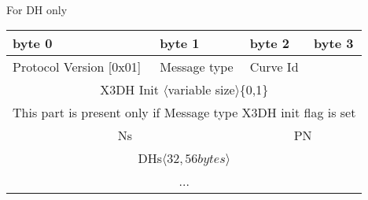 \documentclass[a4paper,11pt]{article}
\begin{document}
      \paragraph*{}For DH only
      \begin{center}
      \begin{tabular}{ | p{1.4in} | p{1.4in} | p{1.4in} | p{1.4in} |}
        \hline
        \cellcolor[gray]{0.85} byte 0 & \cellcolor[gray]{0.85} byte 1 & \cellcolor[gray]{0.85} byte 2 & \cellcolor[gray]{0.85}byte 3\\
        \hline
        Protocol Version [0x01] & Message type & Curve Id & \\
        \cline{1-3}
        \multicolumn{4}{|c|}{X3DH Init $\langle $variable size$\rangle $\{0,1\}}\\
        \multicolumn{4}{|c|}{This part is present only if Message type X3DH init flag is set}\\
        \hline
        \multicolumn{2}{|c}{Ns}&\multicolumn{2}{|c|}{PN}\\
        \hline
        \multicolumn{4}{|c|}{DHs$\langle 32,56 bytes\rangle $}\\
        \multicolumn{4}{|c|}{...}\\
        \hline
      \end{tabular}
      \end{center}
      
\end{document}
